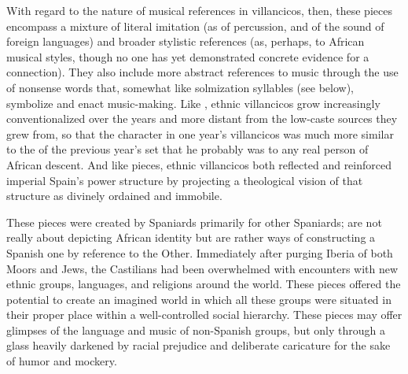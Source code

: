 With regard to the nature of musical references in 
villancicos, then, these pieces encompass a mixture of literal imitation (as of
percussion, and of the  sound of foreign languages) and
broader stylistic references (as, perhaps, to African musical styles, though no
one has yet demonstrated concrete evidence for a connection).
They also include more abstract references to music through the use of nonsense
words that, somewhat like solmization syllables (see below), symbolize and
enact music-making.
Like , ethnic villancicos grow increasingly conventionalized over
the years and more distant from the low-caste sources they grew from, so that
the  character in one year's villancicos was much more similar to
the  of the previous year's set that he probably was to any real
person of African descent.
And like  pieces, ethnic villancicos both reflected and reinforced
imperial Spain's power structure by projecting a theological vision of that
structure as divinely ordained and immobile.

These pieces were created by Spaniards primarily for other Spaniards;
 are not really about depicting African identity but
are rather ways of constructing a Spanish one by reference to the Other.
Immediately after purging Iberia of both Moors and Jews, the Castilians had
been overwhelmed with encounters with new ethnic groups, languages, and
religions around the world. 
These pieces offered the potential to create an imagined world in which all
these groups were situated in their proper place within a well-controlled
social hierarchy.
These pieces may offer glimpses of the language and music of non-Spanish
groups, but only through a glass heavily darkened by racial prejudice and
deliberate caricature for the sake of humor and mockery.

